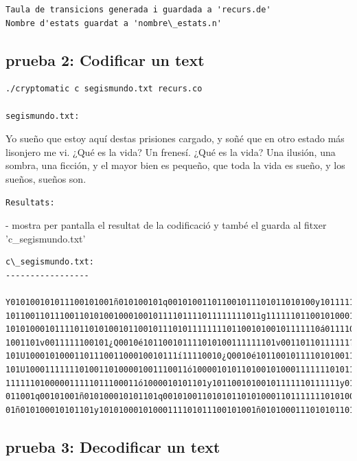 \documentclass[a4paper,12pt]{article}
\begin{document}
\begin{lstlisting}
Taula de transicions generada i guardada a 'recurs.de'
Nombre d'estats guardat a 'nombre\_estats.n'
\end{lstlisting}
\pagebreak
\subsection{prueba 2: Codificar un text}

\begin{lstlisting}
./cryptomatic c segismundo.txt recurs.co 

segismundo.txt:
\end{lstlisting}
Yo sueño que estoy aquí destas prisiones cargado, y soñé que en otro estado más lisonjero me vi. ¿Qué es la vida? Un frenesí. ¿Qué es la vida? Una ilusión, una sombra, una ficción, y el mayor bien es pequeño, que toda la vida es sueño, y los sueños, sueños son.
\begin{lstlisting}
Resultats:
\end{lstlisting}

- mostra per pantalla el resultat de la codificació y també el guarda al fitxer 'c\_segismundo.txt'

\begin{lstlisting}
c\_segismundo.txt:
-----------------

Y010100101011100101001ñ010100101q001010011011001011101011010100y101111111q0010í1010110100101110101111111101111011101011
1011001101110011010100100010010111101111011111111011g1111110110010100010101101y1010111010100ñé101q001010011011001100010
1010100010111101101010010110010111010111111110110010100101111110á01111010100001101110101001000j100111011010100101111110
1001101v0011111100101¿Q0010é101100101111010100111111101v00110110111111?101U1000101000110111001100010010111í11110010¿Q0010é101100101111010100111111101v00110110111111?101U100011111110100110100001001110011ó100001010110100101000111111101011101010011111011010011011111111010101101001010001
111111010000011111011100011ó1000010101101y10110010100101111110111111y01010011011101110100001110011000101100101111011101
011001q00101001ñ010100010101101q001010011010101101010001101111111010100111111101v00110110111111101100101111010111001010
01ñ010100010101101y10101000101000111101011100101001ñ0101000111010101101011100101001ñ010100011110101110101001000111100
\end{lstlisting}


\subsection{prueba 3: Decodificar un text}
\end{document}
